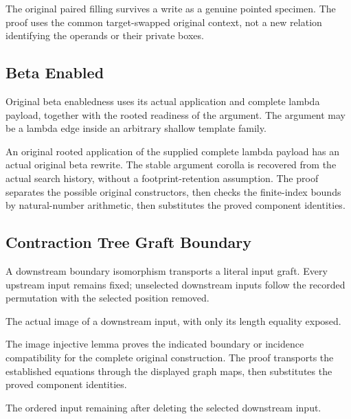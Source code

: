 The original paired filling survives a write as a genuine pointed
specimen. The proof uses the common target-swapped original context, not a
new relation identifying the operands or their private boxes.
\par{}

\subsection{Beta Enabled}
Original beta enabledness uses its actual application and complete
lambda payload, together with the rooted readiness of the argument. The
argument may be a lambda edge inside an arbitrary shallow template family.

An original rooted application of the supplied complete lambda payload
has an actual original beta rewrite. The stable argument corolla is recovered
from the actual search history, without a footprint-retention assumption.
The proof separates the possible original constructors, then checks the finite-index bounds by natural-number arithmetic, then substitutes the proved component identities.
\par{}

\subsection{Contraction Tree Graft Boundary}
A downstream boundary isomorphism transports a literal input graft.
Every upstream input remains fixed; unselected downstream inputs follow the
recorded permutation with the selected position removed.

The actual image of a downstream input, with only its length equality exposed.
\par{}

The image injective lemma proves the indicated boundary or incidence compatibility for the complete original construction.
The proof transports the established equations through the displayed graph maps, then substitutes the proved component identities.
\par{}

The ordered input remaining after deleting the selected downstream input.
\par{}

